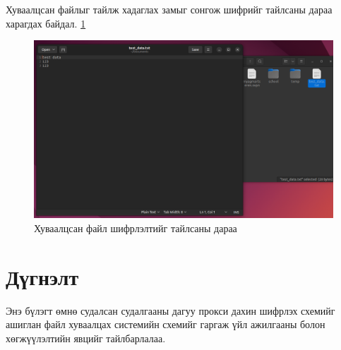 Хуваалцсан файлыг тайлж хадаглах замыг сонгож шифрийг тайлсаны дараа харагдах байдал. \ref{fig:result_decrypt}
\begin{figure}[H]
    \centering
    \includegraphics[scale=0.3]{Figures/example/shared_file_example.png}
    \caption{Хуваалцсан файл шифрлэлтийг тайлсаны дараа}
    \label{fig:result_decrypt}
\end{figure}



\section{Дүгнэлт}
Энэ бүлэгт өмнө судалсан судалгааны дагуу прокси дахин шифрлэх схемийг ашиглан файл хуваалцах системийн схемийг гаргаж үйл ажилгааны болон хөгжүүлэлтийн явцийг тайлбарлалаа.